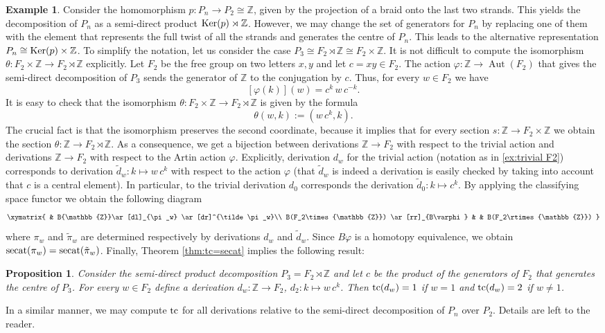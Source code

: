 \documentclass[11pt]{amsart}
\theoremstyle{plain}
\newtheorem{proposition}[theorem]{Proposition}
\theoremstyle{definition}
\newtheorem{example}[theorem]{Example}
\newcommand{\ZZ}{{\mathbb{Z}}}
\newcommand{\Ker}{\mathop{\rm Ker}\nolimits}
\newcommand{\secat}{\mathop{\rm secat}\nolimits}
\newcommand{\tc}{\mathop{\rm tc}\nolimits}
\DeclareMathOperator{\Aut}{Aut}
\begin{document}
\begin{example}
Consider the homomorphism $p\colon P_n\to P_2\cong\ZZ$, given by the projection of a 
braid onto the last two strands. 
This yields the decomposition of
$P_n$ as a semi-direct product $\Ker(p)\rtimes\ZZ$. However, we may change the set of generators for $P_n$ 
by replacing one of them with the element that represents the full twist of all the strands and  
generates the centre of $P_n$. This leads to the alternative representation $P_n\cong\Ker(p)\times\ZZ$.  
To simplify the notation, let us consider the case $P_3\cong F_2\rtimes \ZZ\cong F_2\times \ZZ$.
It is not difficult to compute the isomorphism $\theta\colon F_2\times \ZZ\to F_2\rtimes \ZZ$ explicitly.
Let $F_2$ be the free group on two letters $x,y$ and let $c=xy\in F_2$. The action $\varphi\colon\ZZ\to\Aut(F_2)$
that gives the semi-direct decomposition of $P_3$ sends the generator of $\ZZ$ to the conjugation by $c$. Thus, 
for every $w\in F_2$ we have 
$$[\varphi(k)](w)=c^k\,w\,c^{-k}.$$
It is easy to check that the isomorphism $\theta\colon F_2\times \ZZ\to F_2\rtimes \ZZ$ is given by 
the formula $$\theta(w,k):=(w\,c^k,k).$$
The crucial fact is that the isomorphism preserves the second coordinate, because it implies that for
every section $s\colon\ZZ\to F_2\times\ZZ$ we obtain the section $\theta\colon \ZZ\to F_2\rtimes \ZZ$.  
As a consequence, we get a bijection between derivations $\ZZ\to F_2$ with respect to the trivial action
and derivations $\ZZ\to F_2$ with respect to the Artin action $\varphi$. Explicitly, derivation
$d_w$ for the trivial action (notation as in  \ref{ex:trivial F2}) corresponds to derivation
$\tilde d_w\colon k\mapsto w\,c^k$ with respect to the action $\varphi$ (that $\tilde d_w$ is indeed
a derivation is easily checked by taking into account that $c$ is a central element). In particular,
to the trivial derivation $d_0$ corresponds the derivation $\tilde d_0\colon k\mapsto c^k$. By applying 
the classifying space functor we obtain the following diagram
$$\xymatrix{
& B\ZZ \ar[dl]_{\pi_w}  \ar[dr]^{\tilde \pi_w}\\
B(F_2\times\ZZ) \ar[rr]_{B\varphi} & & B(F_2\rtimes\ZZ)
}$$
where $\pi_w$ and $\tilde \pi_w$ are determined respectively by derivations $d_w$ and $\tilde d_w$.
Since $B\varphi$ is a homotopy equivalence, we obtain $\secat(\pi_w)=\secat(\tilde\pi_w)$. Finally, 
Theorem \ref{thm:tc=secat} implies the following result:

\begin{proposition}
Consider the semi-direct product decomposition $P_3=F_2\rtimes\ZZ$ and let $c$ be the product of the
generators of $F_2$ that generates the centre of $P_3$. For every $w\in F_2$ define 
a derivation $d_w\colon \ZZ\to F_2$, $d_2\colon k\mapsto w\, c^k$. Then 
$\tc(d_w)=1$ if $w=1$ and $\tc(d_w)=2$ if $w\ne 1$.
\end{proposition}

In a similar manner, we may compute $\tc$ for all derivations relative to the 
semi-direct decomposition of $P_n$ over $P_2$. Details are left to the reader.
\end{example}
\end{document}
